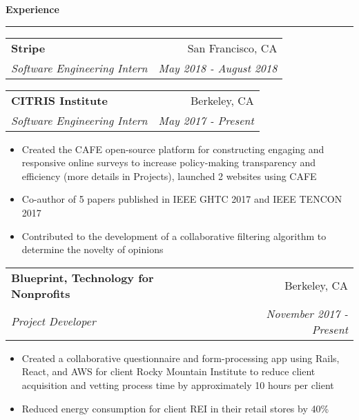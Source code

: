 \documentclass[11pt,letterpaper]{article}
\makeatletter
\newenvironment{topic}[1]
    {
    {\Large \centerline{#1}}
    \vspace*{0.03in}
    \hrule 
    \vspace*{0.05in}
    }
    {}
\newenvironment{event}
    {
    \begin{tabular*}{\textwidth}{l@{\extracolsep{\fill}}r}
    }
    {
    \end{tabular*}
    }
\makeatother
\begin{document}
    \begin{topic}{\textbf{Experience}}
        \begin{event}
            \textbf{Stripe} & San Francisco, CA \\
            \emph{Software Engineering Intern} & \emph{May 2018 - August 2018} \\
        \end{event}

        \begin{event}
            \textbf{CITRIS Institute} & Berkeley, CA \\
            \emph{Software Engineering Intern} & \emph{May 2017 - Present}
        \end{event}
            \begin{itemize}
                \item Created the CAFE open-source platform for constructing engaging and responsive online surveys to increase policy-making transparency and efficiency (more details in Projects), launched 2 websites using CAFE
                \item Co-author of 5 papers published in IEEE GHTC 2017 and IEEE TENCON 2017
                \item Contributed to the development of a collaborative filtering algorithm to determine the novelty of opinions
            \end{itemize}

        \begin{event}
            \textbf{Blueprint, Technology for Nonprofits} & Berkeley, CA \\
            \emph{Project Developer} & \emph{November 2017 - Present}
        \end{event}
            \begin{itemize}
                \item Created a collaborative questionnaire and form-processing app using Rails, React, and AWS for client Rocky Mountain Institute to reduce client acquisition and vetting process time by approximately 10 hours per client
                \item Reduced energy consumption for client REI in their retail stores by 40\% 
            \end{itemize}


\end{topic}
\end{document}
